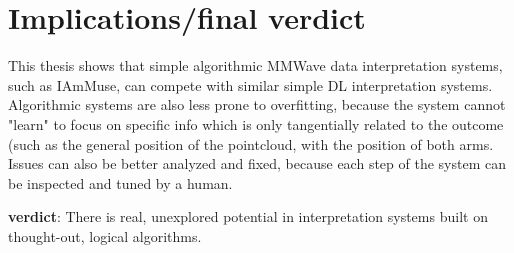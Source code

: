 \section{Implications/final verdict}
\label{section: discussion - implications}

This thesis shows that simple algorithmic MMWave data interpretation systems, such as IAmMuse, can compete with similar simple DL interpretation systems.
Algorithmic systems are also less prone to overfitting, because the system cannot "learn" to focus on specific info which is only tangentially related to the outcome (such as the general position of the pointcloud, with the position of both arms.
Issues can also be better analyzed and fixed, because each step of the system can be inspected and tuned by a human.

\textbf{verdict}: There is real, unexplored potential in interpretation systems built on thought-out, logical algorithms.




